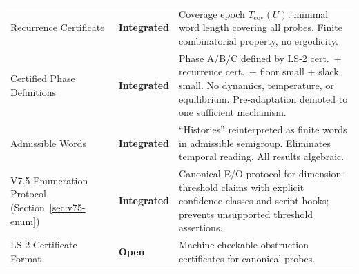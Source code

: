 \documentclass[11pt,a4paper]{article}
\theoremstyle{definition}
\theoremstyle{remark}
\begin{document}
\begin{center}
\begin{tabular}{p{4.5cm}p{2.5cm}p{6.5cm}}
\addlinespace
Recurrence Certificate & \textbf{Integrated} & Coverage epoch $T_{\mathrm{cov}}(U)$: minimal word length covering all probes. Finite combinatorial property, no ergodicity. \\
\addlinespace
Certified Phase Definitions & \textbf{Integrated} & Phase A/B/C defined by LS-2 cert.\ + recurrence cert.\ + floor small + slack small. No dynamics, temperature, or equilibrium. Pre-adaptation demoted to one sufficient mechanism. \\
\addlinespace
Admissible Words & \textbf{Integrated} & ``Histories'' reinterpreted as finite words in admissible semigroup. Eliminates temporal reading. All results algebraic. \\
\addlinespace
V7.5 Enumeration Protocol (Section~\ref{sec:v75-enum}) & \textbf{Integrated} & Canonical E/O protocol for dimension-threshold claims with explicit confidence classes and script hooks; prevents unsupported threshold assertions. \\
\addlinespace
LS-2 Certificate Format & \textbf{Open} & Machine-checkable obstruction certificates for canonical probes. \\
\bottomrule
\end{tabular}
\end{center}
\end{document}
